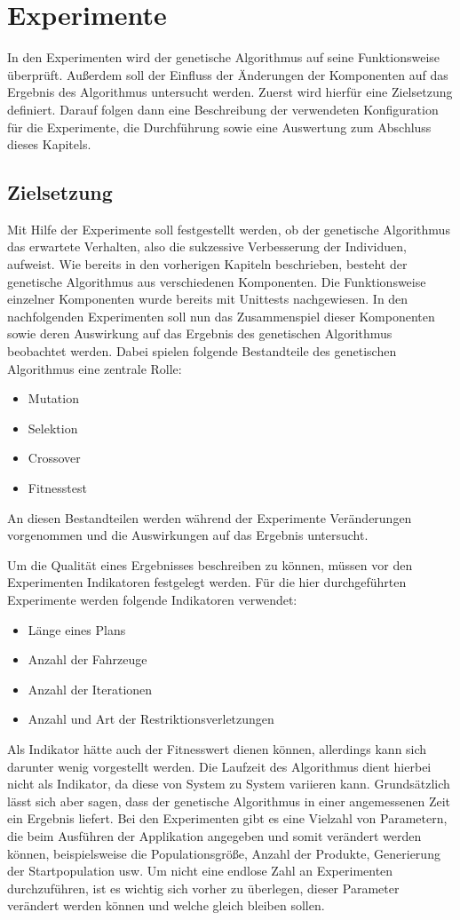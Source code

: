 \section{Experimente}
In den Experimenten wird der genetische Algorithmus auf seine Funktionsweise überprüft. Außerdem soll der Einfluss der Änderungen der Komponenten auf das Ergebnis des Algorithmus untersucht werden. Zuerst wird hierfür eine Zielsetzung definiert. Darauf folgen dann eine Beschreibung der verwendeten Konfiguration für die Experimente, die Durchführung sowie eine Auswertung zum Abschluss dieses Kapitels.

\subsection{Zielsetzung}
\label{sec:Zielsetzung}
Mit Hilfe der Experimente soll festgestellt werden, ob der genetische Algorithmus das erwartete Verhalten, also die sukzessive Verbesserung der Individuen, aufweist. Wie bereits in den vorherigen Kapiteln beschrieben, besteht der genetische Algorithmus aus verschiedenen Komponenten. Die Funktionsweise einzelner Komponenten wurde bereits mit Unittests nachgewiesen. In den nachfolgenden Experimenten soll nun das Zusammenspiel dieser Komponenten sowie deren Auswirkung auf das Ergebnis des genetischen Algorithmus beobachtet werden. Dabei spielen folgende Bestandteile des genetischen Algorithmus eine zentrale Rolle:
\begin{itemize}
 \item Mutation
 \item Selektion
 \item Crossover
 \item Fitnesstest
\end{itemize}
An diesen Bestandteilen werden während der Experimente Veränderungen vorgenommen und die Auswirkungen auf das Ergebnis untersucht.

Um die Qualität eines Ergebnisses beschreiben zu können, müssen vor den Experimenten Indikatoren festgelegt werden. Für die hier durchgeführten Experimente werden folgende Indikatoren verwendet:
\begin{itemize}
 \item Länge eines Plans
 \item Anzahl der Fahrzeuge
 \item Anzahl der Iterationen
 \item Anzahl und Art der Restriktionsverletzungen
\end{itemize}
Als Indikator hätte auch der Fitnesswert dienen können, allerdings kann sich darunter wenig vorgestellt werden. Die Laufzeit des Algorithmus dient hierbei nicht als Indikator, da diese von System zu System variieren kann. Grundsätzlich lässt sich aber sagen, dass der genetische Algorithmus in einer angemessenen Zeit ein Ergebnis liefert.
Bei den Experimenten gibt es eine Vielzahl von Parametern, die beim Ausführen der Applikation angegeben und somit verändert werden können, beispielsweise die Populationsgröße, Anzahl der Produkte, Generierung der Startpopulation usw. Um nicht eine endlose Zahl an Experimenten durchzuführen, ist es wichtig sich vorher zu überlegen,  dieser Parameter verändert werden können und welche gleich bleiben sollen.

